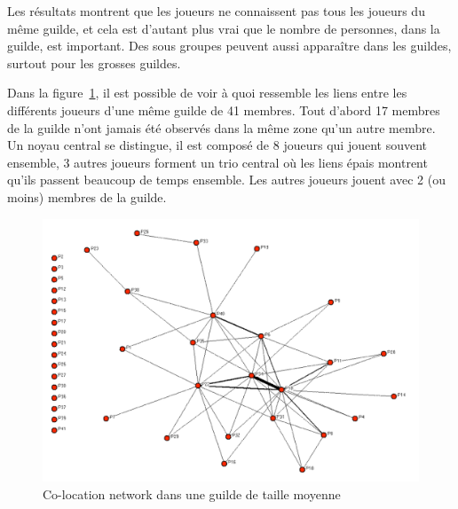 \par Les résultats montrent que les joueurs ne connaissent pas tous les joueurs du même guilde, et cela est d'autant plus vrai que le nombre de personnes, dans la guilde, est important. Des sous groupes peuvent aussi apparaître dans les guildes, surtout pour les grosses guildes. 
\par Dans la figure~\ref{co-location}, il est possible de voir à quoi ressemble les liens entre les différents joueurs d'une même guilde de 41 membres. Tout d'abord 17 membres de la guilde n'ont jamais été observés dans la même zone qu'un autre membre. Un noyau central se distingue, il est composé de 8 joueurs qui jouent souvent ensemble, 3 autres joueurs forment un trio central où les liens épais montrent qu'ils passent beaucoup de temps ensemble. Les autres joueurs jouent avec 2 (ou moins) membres de la guilde.
	 \begin{figure}[!h]
        \centering
        \includegraphics[scale=0.95]{./Ressources/Images/co-location.png}
        \caption{Co-location network dans une guilde de taille moyenne}
        \label{co-location}
        \end{figure}

